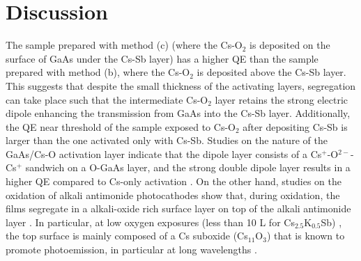 \section{Discussion}

The sample prepared with method (c) (where the Cs-O$_2$ is deposited on the surface of GaAs under the Cs-Sb layer) has a higher QE than the sample prepared with method (b), where the Cs-O$_2$ is deposited above the Cs-Sb layer. This suggests that despite the small thickness of the activating layers, segregation can take place such that the intermediate Cs-O$_2$ layer retains the strong electric dipole enhancing the transmission from GaAs into the Cs-Sb layer.
Additionally, the QE near threshold of the sample exposed to Cs-O$_2$ after depositing Cs-Sb is larger than the one activated only with Cs-Sb.
Studies on the nature of the GaAs/Cs-O activation layer indicate that the dipole layer consists of a Cs$^+$-O$^{2-}$-Cs$^+$ sandwich on a O-GaAs layer, and the strong double dipole layer results in a higher QE compared to Cs-only activation \cite{su1983}. On the other hand, studies on the oxidation of alkali antimonide photocathodes show that, during oxidation, the films segregate in a alkali-oxide rich surface layer on top of the alkali antimonide layer \cite{soriano1993}. In particular, at low oxygen exposures (less than 10 L for Cs$_{2.5}$K$_{0.5}$Sb) \cite{soriano1993}, the top surface is mainly composed of a Cs suboxide (Cs$_{11}$O$_3$) \cite{galdiNAPAC} that is known to promote photoemission, in particular at long wavelengths \cite{bates1981}.

